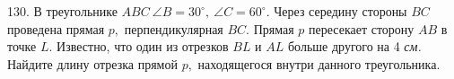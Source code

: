 130. В треугольнике $ABC\ \angle B=30^\circ,\ \angle C=60^\circ.$ Через середину стороны $BC$ проведена прямая $p,$ перпендикулярная $BC.$ Прямая $p$ пересекает сторону $AB$ в точке $L.$ Известно, что один из отрезков $BL$ и $AL$ больше другого на 4 {\it см.} Найдите длину отрезка прямой $p,$ находящегося внутри данного треугольника.\\
